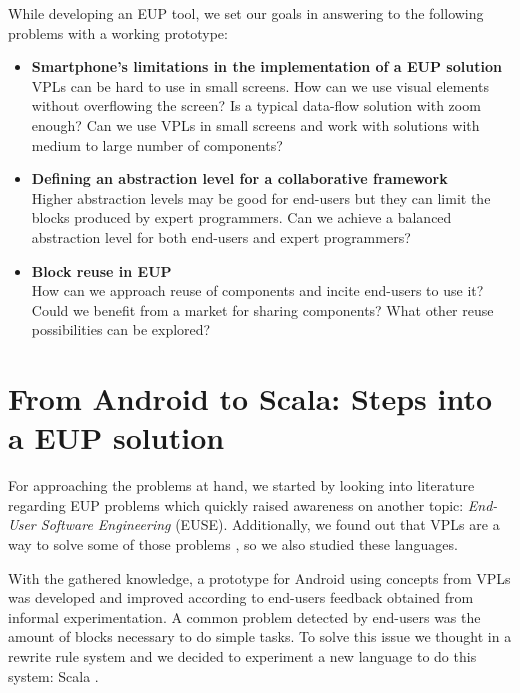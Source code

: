 \documentclass[9pt,a4paper]{extarticle}
\begin{document}
\begin{multicols}{2}
While developing an EUP tool, we set our goals in answering to the following problems with a working prototype:

\begin{itemize}
	\item{\textbf{Smartphone's limitations in the implementation of a EUP solution} \\
    VPLs can be hard to use in small screens. How can we use visual elements without overflowing the screen? Is a typical data-flow solution with zoom enough? Can we use VPLs in small screens and work with solutions with medium to large number of components?}
	
	\item{\textbf{Defining an abstraction level for a collaborative framework} \\
	Higher abstraction levels may be good for end-users but they can limit the blocks produced by expert programmers. Can we achieve a balanced abstraction level for both end-users and expert programmers?}
  
	\item{\textbf{Block reuse in EUP} \\
    How can we approach reuse of components and incite end-users to use it?
    Could we benefit from a market for sharing components? What other reuse possibilities can be explored?}
	
\end{itemize}

\section{From Android to Scala: Steps into a EUP solution}\label{sec:work}

For approaching the problems at hand, we started by looking into literature regarding EUP problems \cite{Barriers2004} which quickly raised awareness on another topic: \emph{End-User Software Engineering} (EUSE).
Additionally, we found out that VPLs are a way to solve some of those problems \cite{Navarro2001}, so we also studied these languages.

With the gathered knowledge, a prototype for Android using concepts from VPLs was developed and improved according to end-users feedback obtained from informal experimentation. 
A common problem detected by end-users was the amount of blocks necessary to do simple tasks. To solve this issue we thought in a rewrite rule system and we decided to experiment a new language to do this system: Scala \cite{ProgrammingScala}.


\end{multicols}
\end{document}
